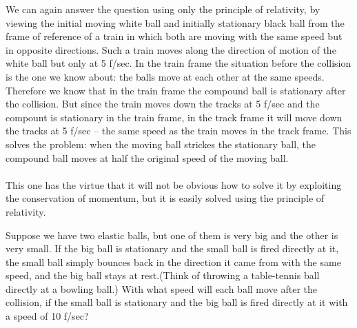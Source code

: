 We can again answer the question using only the principle of relativity, by viewing the initial moving white ball and initially stationary black ball from the frame of reference of a train in which both are moving with the same speed but in opposite directions. Such a train moves along the direction of motion of the white ball but only at 5 f/sec. In the train frame the situation before the collision is the one we know about: the balls move at each other at the same speeds. Therefore we know that in the train frame the compound ball is stationary after the collision. But since the train moves down the tracks at 5 f/sec and the compount is stationary in the train frame, in the track frame it will move down the tracks at 5 f/sec -- the same speed as the train moves in the track frame. This solves the problem: when the moving ball strickes the stationary ball, the compound ball moves at half the original speed of the moving ball.    
\\\\
This one has the virtue that it will not be obvious how to solve it by exploiting the conservation of momentum, but it is easily solved using the principle of relativity. 

Suppose we have two elastic balls, but one of them is very big and the other is very small. If the big ball is stationary and the small ball is fired directly at it, the small ball simply bounces back in the direction it came from with the same speed, and the big ball stays at rest.(Think of throwing a table-tennis ball directly at a bowling ball.) With what speed will each ball move after the collision, if the small ball is stationary and the big ball is fired directly at it with a speed of 10 f/sec?

